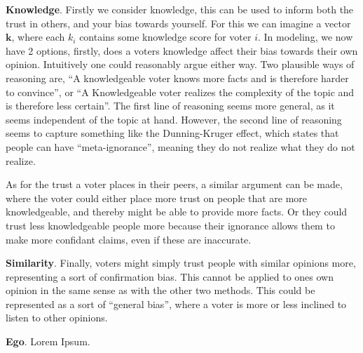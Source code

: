 
\textbf{Knowledge}. Firstly we consider knowledge, this can be used to
inform both the trust in others, and your bias towards yourself. For this we
can imagine a vector $\boldsymbol{k}$, where each $k_i$ contains some knowledge
score for voter $i$. In modeling, we now have 2 options, firstly, does a voters
knowledge affect their bias towards their own opinion. Intuitively one could
reasonably argue either way. Two plausible ways of reasoning are, ``A
knowledgeable voter knows more facts and is therefore harder to convince'', or
``A Knowledgeable voter realizes the complexity of the topic and is therefore
less certain''. The first line of reasoning seems more general, as it seems
independent of the topic at hand. However, the second line of reasoning seems
to capture something like the Dunning-Kruger effect, which states that people
can have ``meta-ignorance'', meaning they do not realize what they do not realize.

As for the trust a voter places in their peers, a similar argument can be made,
where the voter could either place more trust on people that are more
knowledgeable, and thereby might be able to provide more facts. Or they could
trust less knowledgeable people more because their ignorance allows them to
make more confidant claims, even if these are inaccurate.


\textbf{Similarity}. Finally, voters might simply trust people with
similar opinions more, representing a sort of confirmation bias. This cannot be
applied to ones own opinion in the same sense as with the other two methods.
This could be represented as a sort of ``general bias'', where a voter is more
or less inclined to listen to other opinions.

\textbf{Ego}. Lorem Ipsum.

